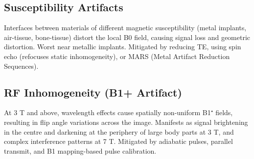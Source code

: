 				

\subsection{Susceptibility Artifacts}

				

Interfaces between materials of different magnetic susceptibility (metal implants, air-tissue, bone-tissue) distort the local B0 field, causing signal loss and geometric distortion. Worst near metallic implants. Mitigated by reducing TE, using spin echo (refocuses static inhomogeneity), or MARS (Metal Artifact Reduction Sequences).

				

\subsection{RF Inhomogeneity (B1+ Artifact)}

				


				

At 3 T and above, wavelength effects cause spatially non-uniform B1⁺ fields, resulting in flip angle variations across the image. Manifests as signal brightening in the centre and darkening at the periphery of large body parts at 3 T, and complex interference patterns at 7 T. Mitigated by adiabatic pulses, parallel transmit, and B1 mapping-based pulse calibration.




